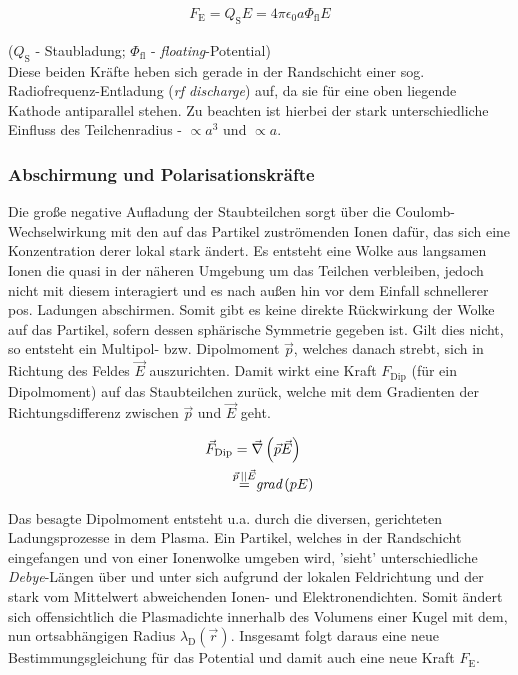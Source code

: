 \documentclass[numbers=noenddot,a4paper]{scrartcl}
\newcommand{\ix}[1]{_\text{#1}}
\newcommand{\tilt}[1]{\textit{#1}}
\newcommand{\grad}[1]{\textit{grad}\left(#1\right)}
\begin{document}
					\begin{align}
					F\ix{E}=Q\ix{S} E=4 \pi \epsilon\ix{0} a \Phi\ix{fl} E
					\end{align}
		
				($Q\ix{S}$ - Staubladung; $\Phi\ix{fl}$ - \tilt{floating}-Potential)\\
				Diese beiden Kräfte heben sich gerade in der Randschicht einer sog. Radiofrequenz-Entladung (\tilt{rf discharge}) auf, da sie für eine oben liegende Kathode antiparallel stehen. Zu beachten ist hierbei der stark unterschiedliche Einfluss des Teilchenradius - $\propto a^3$ und $\propto a$.\\
								
				\subsubsection{Abschirmung und Polarisationskräfte}\label{subsub:abschirm}
				
				Die große negative Aufladung der Staubteilchen sorgt über die Coulomb-Wechselwirkung mit den auf das Partikel zuströmenden Ionen dafür, das sich eine Konzentration derer lokal stark ändert. Es entsteht eine Wolke aus langsamen Ionen die quasi in der näheren Umgebung um das Teilchen verbleiben, jedoch nicht mit diesem interagiert und es nach außen hin vor dem Einfall schnellerer pos. Ladungen abschirmen. Somit gibt es keine direkte Rückwirkung der Wolke auf das Partikel, sofern dessen sphärische Symmetrie gegeben ist. Gilt dies nicht, so entsteht ein Multipol- bzw. Dipolmoment $\vec{p}$, welches danach strebt, sich in Richtung des Feldes $\vec{E}$ auszurichten. Damit wirkt eine Kraft $F\ix{Dip}$ (für ein Dipolmoment) auf das Staubteilchen zurück, welche mit dem Gradienten der Richtungsdifferenz zwischen $\vec{p}$ und $\vec{E}$ geht.

					\begin{align}
						\centering
						\vec{F}\ix{Dip}&=\vec{\nabla}\left(\vec{p}\vec{E}\right)\\
						&{\overset{\vec{p}\,||\vec{E}}{=}}\grad{pE} \nonumber
					\end{align}
					
				Das besagte Dipolmoment entsteht u.a. durch die diversen, gerichteten Ladungsprozesse in dem Plasma. Ein Partikel, welches in der Randschicht eingefangen und von einer Ionenwolke umgeben wird, 'sieht' unterschiedliche \tilt{Debye}-Längen über und unter sich aufgrund der lokalen Feldrichtung und der stark vom Mittelwert abweichenden Ionen- und Elektronendichten. Somit ändert sich offensichtlich die Plasmadichte innerhalb des Volumens einer Kugel mit dem, nun ortsabhängigen Radius $\lambda\ix{D}\left(\vec{r}\right)$. Insgesamt folgt daraus eine neue Bestimmungsgleichung für das Potential und damit auch eine neue Kraft $F\ix{E}$.
				
\end{document}
